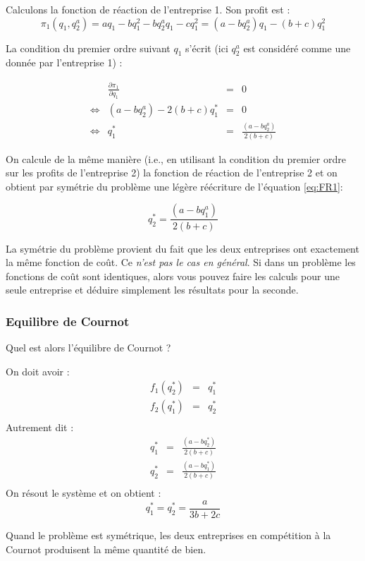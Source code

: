 \documentclass[
  a4paper,
]{book}
\theoremstyle{definition}
\theoremstyle{definition}
\theoremstyle{definition}
\theoremstyle{definition}
\theoremstyle{remark}
\begin{document}
Calculons la fonction de réaction de l'entreprise 1.
Son profit est :
\[
\pi_1(q_1, q_2^a) = aq_1-bq_1^2-bq_2^aq_1-cq_1^2 = (a-bq_2^a)q_1-(b+c)q_1^2
\]

La condition du premier ordre suivant \(q_1\) s'écrit (ici \(q_2^a\) est considéré comme une donnée par l'entreprise 1) :

\[
\begin{array}{crcl}
&\frac{\partial \pi_1}{\partial q_1}&=&0\\
\Leftrightarrow & (a-bq_2^a)-2(b+c)q_1^* &=& 0\\
\Leftrightarrow & q_1^* &=& \frac{(a-bq_2^a)}{2(b+c)}
\label{eq:FR1}
\end{array}
\]

On calcule de la même manière (i.e., en utilisant la condition du premier ordre sur les profits de l'entreprise 2) la fonction de réaction de l'entreprise 2 et on obtient par symétrie du problème une légère réécriture de l'équation \eqref{eq:FR1}:

\[
q_2^* = \frac{(a-bq_1^a)}{2(b+c)}
\]

La symétrie du problème provient du fait que les deux entreprises ont exactement la même fonction de coût.
Ce \emph{n'est pas le cas en général}.
Si dans un problème les fonctions de coût sont identiques, alors vous pouvez faire les calculs pour une seule entreprise et déduire simplement les résultats pour la seconde.

\hypertarget{equilibre-de-cournot}{%
\subsubsection{Equilibre de Cournot}\label{equilibre-de-cournot}}

Quel est alors l'équilibre de Cournot ?

On doit avoir :
\[
\begin{array}{rcl}
f_1(q_2^*) &=& q_1^*\\
f_2(q_1^*) &=& q_2^*\\
\end{array}
\]
Autrement dit :
\[
\begin{array}{rcl}
q_1^* &=& \frac{(a-bq_2^*)}{2(b+c)} \\
q_2^* &=&\frac{(a-bq_1^*)}{2(b+c)}\\
\end{array}
\]
On résout le système et on obtient :
\[
q_1^*=q_2^* = \frac{a}{3b+2c}
\]

Quand le problème est symétrique, les deux entreprises en compétition à la Cournot produisent la même quantité de bien.
\end{document}

